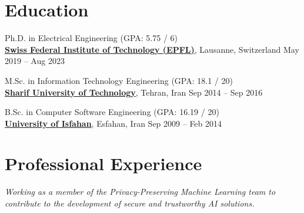 \documentclass[11pt]{article}
\begin{document}
\section{Education}
\begin{outerlist}

	\item Ph.D. in Electrical Engineering (GPA: 5.75 / 6)\\
	\href{https://www.epfl.ch/en/home/}{\textbf{Swiss Federal Institute of Technology (EPFL)}}, Lausanne, Switzerland \hfill {May 2019 -- Aug 2023}

	\item M.Sc. in Information Technology Engineering (GPA: 18.1 / 20)\\
	\href{http://www.en.sharif.edu/}{\textbf{Sharif University of Technology}}, Tehran, Iran \hfill {Sep 2014 -- Sep 2016}

	\item B.Sc. in Computer Software Engineering (GPA: 16.19 / 20)\\
	\href{http://ui.ac.ir/EN}{\textbf{University of Isfahan}}, Esfahan, Iran \hfill {Sep 2009 -- Feb 2014}

\end{outerlist}


\section{Professional Experience}

\textit{Working as a member of the Privacy-Preserving Machine Learning team to contribute to the development of secure and trustworthy AI solutions.}
\end{document}
